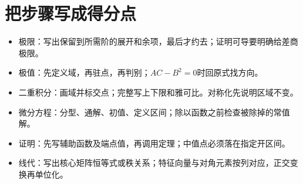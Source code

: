 \section{把步骤写成得分点}
\begin{itemize}
\item 极限：写出保留到所需阶的展开和余项，最后才约去；证明可导要明确给差商极限。
\item 极值：先定义域，再驻点，再判别；$AC-B^2=0$时回原式找方向。
\item 二重积分：画域并标交点；完整写上下限和雅可比。对称化先说明区域不变。
\item 微分方程：分型、通解、初值、定义区间；除以函数之前检查被除掉的常值解。
\item 证明：先写辅助函数及端点值，再调用定理；中值点必须落在指定开区间。
\item 线代：写出核心矩阵恒等式或秩关系；特征向量与对角元素按列对应，正交变换再单位化。
\end{itemize}
